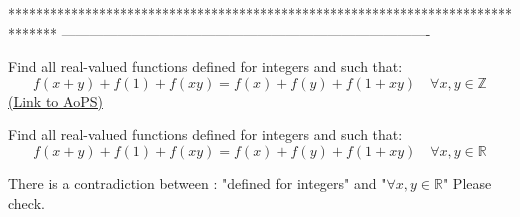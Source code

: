 *******************************************************************************
-------------------------------------------------------------------------------

\begin{problem}
	Find all real-valued functions defined for integers and such that:
\[f (x + y) + f (1) + f (xy) = f (x) + f (y) + f (1 + xy)\quad \forall x,y\in\mathbb{Z}\]
	\flushright \href{https://artofproblemsolving.com/community/c6h568652}{(Link to AoPS)}
\end{problem}



\begin{solution}
	\begin{tcolorbox}Find all real-valued functions defined for integers and such that:
\[f (x + y) + f (1) + f (xy) = f (x) + f (y) + f (1 + xy)\quad \forall x,y\in\mathbb{R}\]\end{tcolorbox}
There is a contradiction between : "defined for integers"  and "$\forall x,y\in\mathbb R$"
Please check.
\end{solution}



